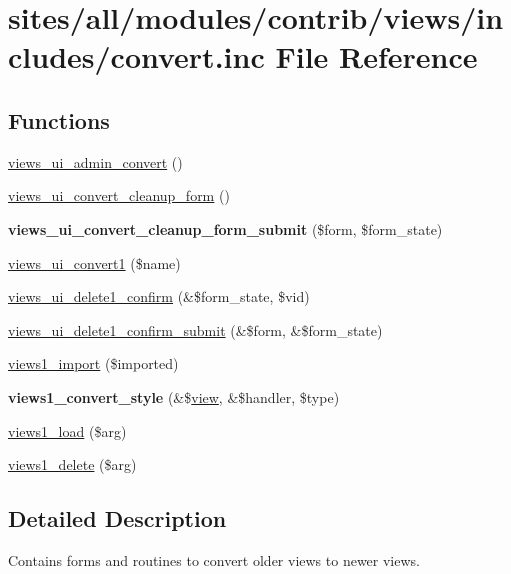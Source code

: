 \hypertarget{convert_8inc}{
\section{sites/all/modules/contrib/views/includes/convert.inc File Reference}
\label{convert_8inc}
}
\subsection*{Functions}
\begin{CompactItemize}
\item 
\hyperlink{convert_8inc_4973172fbb47b6bca489dcb7ee39acbd}{views\_\-ui\_\-admin\_\-convert} ()
\item 
\hyperlink{convert_8inc_54b9bf835ef91d928ad8aeb9784a7af6}{views\_\-ui\_\-convert\_\-cleanup\_\-form} ()
\item 
\hypertarget{convert_8inc_e6858ea5003178fd8793068dae4d6c1c}{
\textbf{views\_\-ui\_\-convert\_\-cleanup\_\-form\_\-submit} (\$form, \$form\_\-state)}
\label{convert_8inc_e6858ea5003178fd8793068dae4d6c1c}

\item 
\hyperlink{convert_8inc_b48ce81999b85b4e7dae3c3d37747fb4}{views\_\-ui\_\-convert1} (\$name)
\item 
\hyperlink{convert_8inc_de6d4a86710f754ba1e05be3b446d95f}{views\_\-ui\_\-delete1\_\-confirm} (\&\$form\_\-state, \$vid)
\item 
\hyperlink{convert_8inc_ebaef1b0acd2551dcd4aee8aee9107db}{views\_\-ui\_\-delete1\_\-confirm\_\-submit} (\&\$form, \&\$form\_\-state)
\item 
\hyperlink{convert_8inc_0a6dfe46ad7fe5c706ac52e4e27e7c2f}{views1\_\-import} (\$imported)
\item 
\hypertarget{convert_8inc_21ebfc7455ab025f46ddbce4567ea20e}{
\textbf{views1\_\-convert\_\-style} (\&\$\hyperlink{classview}{view}, \&\$handler, \$type)}
\label{convert_8inc_21ebfc7455ab025f46ddbce4567ea20e}

\item 
\hyperlink{convert_8inc_51f4ca218bd8d9f46f486bf5b7be1862}{views1\_\-load} (\$arg)
\item 
\hyperlink{convert_8inc_9f7d9a6b600935de6e5ed9ff947bfed8}{views1\_\-delete} (\$arg)
\end{CompactItemize}


\subsection{Detailed Description}
Contains forms and routines to convert older views to newer views. 

